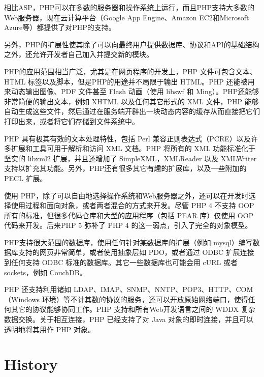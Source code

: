 


相比ASP，PHP可以在多数的服务器和操作系统上运行，而且PHP支持大多数的Web服务器，现在云计算平台（Google App Engine、Amazon EC2和Microsoft Azure等）都提供了对PHP的支持。

另外，PHP的扩展性使其除了可以向最终用户提供数据库、协议和API的基础结构之外，还允许开发者自己加入并提交新的模块。



PHP的应用范围相当广泛，尤其是在网页程序的开发上，PHP 文件可包含文本、HTML 标签以及脚本，但是PHP的用途并不局限于输出 HTML。PHP 还能被用来动态输出图像、PDF 文件甚至 Flash 动画（使用 libswf 和 Ming）。PHP还能够非常简便的输出文本，例如 XHTML 以及任何其它形式的 XML 文件，PHP 能够自动生成这些文件，然后通过在服务端开辟出一块动态内容的缓存从而直接把它们打印出来，或者将它们存储到文件系统中。







PHP 具有极其有效的文本处理特性，包括 Perl 兼容正则表达式（PCRE）以及许多扩展和工具可用于解析和访问 XML 文档。PHP 将所有的 XML 功能标准化于坚实的 libxml2 扩展，并且还增加了 SimpleXML，XMLReader 以及 XMLWriter 支持以扩充其功能。另外，PHP还有很多其它有趣的扩展库，以及一些附加的 PECL 扩展。






使用 PHP，除了可以自由地选择操作系统和Web服务器之外，还可以在开发时选择使用过程和面向对象，或者两者混合的方式来开发。尽管 PHP 4 不支持 OOP 所有的标准，但很多代码仓库和大型的应用程序（包括 PEAR 库）仅使用 OOP 代码来开发。后来PHP 5 弥补了 PHP 4 的这一弱点，引入了完全的对象模型。

PHP支持很大范围的数据库，使用任何针对某数据库的扩展（例如 mysql）编写数据库支持的网页非常简单，或者使用抽象层如 PDO，或者通过 ODBC 扩展连接到任何支持 ODBC 标准的数据库。其它一些数据库也可能会用 cURL 或者 sockets，例如 CouchDB。



PHP 还支持利用诸如 LDAP、IMAP、SNMP、NNTP、POP3、HTTP、COM（Windows 环境）等不计其数的协议的服务，还可以开放原始网络端口，使得任何其它的协议能够协同工作。PHP 支持和所有Web开发语言之间的 WDDX 复杂数据交换。关于相互连接，PHP 已经支持了对 Java 对象的即时连接，并且可以透明地将其用作 PHP 对象。









\chapter{History}




